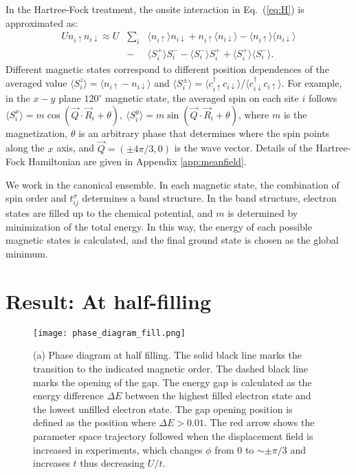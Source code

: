 \documentclass[%
reprint,
superscriptaddress,
twocolumn,
 amsmath,amssymb,
 aps,
 prb,
]{revtex4-2}
\begin{document}
In the Hartree-Fock treatment, the onsite interaction in Eq.~(\ref{eq:H}) is approximated as:
\begin{eqnarray}
    Un_{i\uparrow}n_{i\downarrow} \approx U &\sum_i & \langle n_{i\uparrow}\rangle n_{i\downarrow}+n_{i\uparrow}\langle n_{i\downarrow}\rangle -\langle n_{i\uparrow}\rangle \langle n_{i\downarrow}\rangle\nonumber\\
    & -&\langle S_i^+\rangle S_i^--\langle S_i^-\rangle S_i^++\langle S_i^+\rangle \langle S_i^-\rangle.
    \label{eq:HF}
\end{eqnarray}
Different magnetic states correspond to different position dependences of the averaged value $\langle S^z_{i}\rangle=\langle n_{i\uparrow}-n_{i\downarrow}\rangle$ and $\langle S_i^\pm\rangle=\langle c^\dagger_{i\uparrow}c_{i\downarrow}\rangle$/$\langle c^\dagger_{i\downarrow}c_{i\uparrow}\rangle$. For example, in the $x-y$ plane $120^{\circ}$ magnetic state, the averaged spin on each site $i$ follows $\langle S_i^x\rangle= m\cos(\vec{Q}\cdot\vec{R}_i+\theta),~\langle S_i^y\rangle= m\sin(\vec{Q}\cdot\vec{R}_i+\theta)$, where $m$ is the magnetization, $\theta$ is an arbitrary phase that determines where the spin points along the $x$ axis, and $\vec{Q}=(\pm4\pi/3,0)$ is the wave vector. Details of the Hartree-Fock Hamiltonian are given in Appendix \ref{app:meanfield}. 

We work in the canonical ensemble. In each magnetic state, the combination of spin order and $t^\sigma_{ij}$ determines a band structure. In the band structure, electron states are filled up to the chemical potential, and $m$ is determined by minimization of the total energy. In this way, the energy of each possible magnetic states is calculated, and the final ground state is chosen as the global minimum.


\section{Result: At half-filling}\label{sec:halffilling}
\begin{figure}[t]
  \texttt{[image: phase\_diagram\_fill.png]}
  \caption{(a) Phase diagram at half filling. The solid black line marks the transition to the indicated magnetic order. The dashed black line marks the opening of the gap. The energy gap is calculated as the energy difference $\Delta E$ between the highest filled electron state and the lowest unfilled electron state.   The gap opening position is defined as the position where $\Delta E > 0.01$. The red arrow shows the parameter space trajectory followed when the displacement field is increased in experiments, which changes $\phi$ from $0$ to $\sim \pm \pi/3$ and increases $t$ thus decreasing $U/t$.}
  \label{fig:phase_half}
\end{figure}
\end{document}
